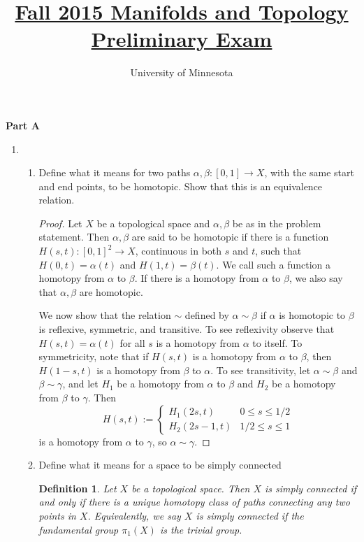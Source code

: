 \documentclass{article}
\title{\href{https://math.umn.edu/sites/math.umn.edu/files/exams/mantopf15.pdf}{Fall 2015 Manifolds and Topology Preliminary Exam}}
\author{University of Minnesota}
\date{}
\newtheorem*{definition}{Definition}
\begin{document}
\maketitle

\textbf{Part A}
\begin{enumerate}
	\item \begin{enumerate}
		
		\item Define what it means for two paths $\alpha, \beta: [0,1] \rightarrow X$, with the same start and end points, to be homotopic. Show that this is an equivalence relation.
		
		\begin{proof}
			Let $X$ be a topological space and $\alpha,\beta$ be as in the problem statement. Then $\alpha, \beta$ are said to be homotopic if there is a function $H(s,t):[0,1]^2 \rightarrow X$, continuous in both $s$ and $t$, such that $H(0,t) = \alpha(t)$ and $H(1,t)=\beta(t)$. We call such a function a homotopy from $\alpha$ to $\beta$. If there is a homotopy from $\alpha$ to $\beta$, we also say that $\alpha, \beta$ are homotopic.
			
			We now show that the relation $\sim$ defined by $\alpha \sim \beta$ if $\alpha$ is homotopic to $\beta$ is reflexive, symmetric, and transitive. 
			To see reflexivity observe that $H(s,t) = \alpha(t)$ for all $s$ is a homotopy from $\alpha$ to itself.
			To symmetricity, note that if $H(s,t)$ is a homotopy from $\alpha$ to $\beta$, then $H(1-s,t)$ is a homotopy from $\beta$ to $\alpha$.
			To see transitivity, let $\alpha \sim \beta$ and $\beta \sim \gamma$, and let $H_1$ be a homotopy from $\alpha$ to $\beta$ and $H_2$ be a homotopy from $\beta$ to $\gamma$. 
			Then 
			\[H(s,t) := \begin{cases} H_1(2s,t) & 0 \leq s \leq 1/2 \\ H_2(2s-1,t) & 1/2 \leq s \leq 1 \end{cases}\] 
			is a homotopy from $\alpha$ to $\gamma$, so $\alpha \sim \gamma$.
		\end{proof}
		
		\item Define what it means for a space to be simply connected
		
		\begin{definition}
			Let $X$ be a topological space. Then $X$ is simply connected if and only if there is a unique homotopy class of paths connecting any two points in $X$. Equivalently, we say $X$ is simply connected if the fundamental group $\pi_1(X)$ is the trivial group.
		\end{definition}
		

\end{enumerate}
\end{enumerate}
\end{document}
